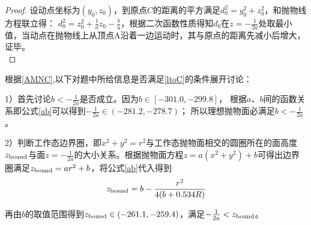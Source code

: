 \documentclass{cumcmthesis}
\begin{document}
\begin{proof}
		设动点坐标为$(y_0,z_0)$，到原点$C$的距离的平方满足$d_0^2 = y_0^2 + z_0^2$，和抛物线方程联立得：
		$d_0^2 = z_0^2 + \frac{1}{a}z_0 - \frac{b}{a}$，根据二次函数性质得知$d_0$在$z = -\frac{1}{2a}$处取最小值，当动点在抛物线上从顶点A沿着一边运动时，其与原点的距离先减小后增大，证毕。\\
		\label{ptoC}
\end{proof}\par 
根据\cref{AMNC},以下对题中所给信息是否满足\cref{ltoC}的条件展开讨论：\par 
1）首先讨论$b < -\frac{1}{2a}$是否成立。因为$b \in [-301.0 ,-299.8]$，
根据$a$、$b$间的函数关系即公式\cref{ab}可以得到$-\frac{1}{2a} \in (-281.2, -278.7)$；
所以理想抛物面必满足$b < -\frac{1}{2a}$。\par
2）判断工作态边界圈，即$x^2 + y^2 = r^2$与工作态抛物面相交的圆圈所在的面高度$z_{\rm{bound}}$与面$z = -\frac{1}{2a}$的大小关系。根据抛物面方程$z = a(x^2 + y^2)+b$可得出边界圈满足$z_{\rm{bound}} = ar^2 + b$，将公式\cref{ab}代入得到
\begin{equation}
		z_{\rm{bound}} = b - \frac{r^2}{4(b + 0.534R)}
		\label{bound}
\end{equation}\par 
再由$b$的取值范围得到$z_{\rm{bound}} \in (-261.1, -259.4)$，满足$ -\frac{1}{2a} < z_{\rm{bound}}$。
\end{document}
